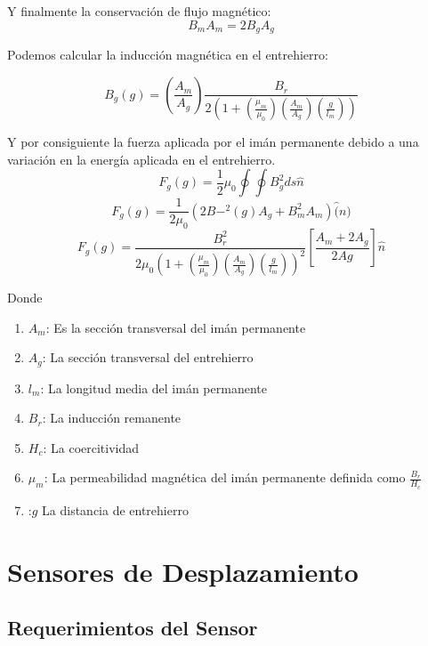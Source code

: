 Y finalmente la conservación de flujo magnético:
\begin{equation}
	B_m A_m = 2B_g A_g
\end{equation}

Podemos calcular la inducción magnética en el entrehierro:

\begin{equation}
	  B_g(g) = (\frac{A_m}{A_g}) \frac{B_r}{2(1+(\frac{\mu_m}{\mu_0})(\frac{A_m}{A_g})(\frac{g}{l_m}))} 
\end{equation}

Y por consiguiente la fuerza aplicada por el imán permanente debido a una variación en la energía aplicada en el entrehierro.
\begin{equation}
	F_g(g)= \frac{1}{2} \mu_0  \oint \oint B_g^2 ds \hat{n}
\end{equation}
\begin{equation}
	F_g(g)= \frac{1}{2 \mu_0} (2B-^2(g)A_g +B_m^2A_m)  \hat(n)
\end{equation}
\begin{equation}
	F_g(g) = \frac{B_r^2}{2 \mu_0 (1 + (\frac{\mu_m}{\mu_0})(\frac{A_m}{A_g})(\frac{g}{l_m}))^2}[\frac{A_m + 2A_g}{2Ag}] \hat{n}
\end{equation}

Donde
\begin{enumerate}
	\item $A_m$: Es la sección transversal del imán permanente
	\item $A_g$: La sección transversal del entrehierro
	\item $l_m$: La longitud media del imán permanente
	\item $B_r$: La inducción remanente
	\item $H_c$: La coercitividad
	\item $\mu_m$: La permeabilidad magnética del imán permanente definida como  $\frac{B_r}{H_c}$
	\item:$g$ La distancia de entrehierro

\end{enumerate}

\section{Sensores de Desplazamiento}
\label{sec:related:sec3}
\subsection{Requerimientos del Sensor}

